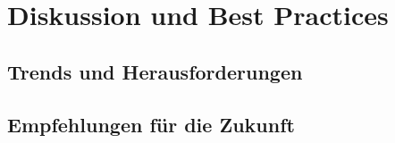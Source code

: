 \chapter{Diskussion und Best Practices}

\section{Trends und Herausforderungen}

\section{Empfehlungen für die Zukunft}